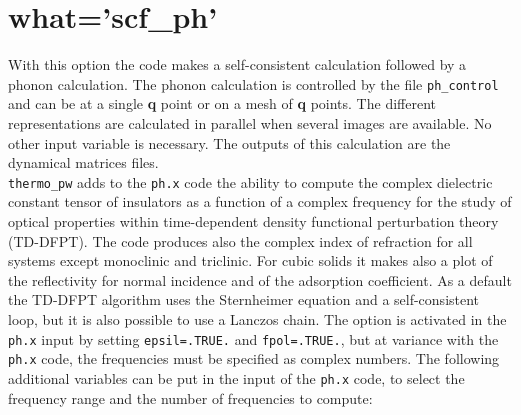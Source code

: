 \documentclass[12pt,a4paper,twoside]{report}
\begin{document}
\newpage
{\color{coral}\section{what='scf\_ph'}}
\color{black}
With this option the code makes a self-consistent calculation followed
by a phonon calculation. The phonon calculation is controlled by the file
\texttt{ph\_control} and can be at a single {\bf q} point or on a mesh of 
{\bf q} points. 
The different representations are calculated in parallel when several images 
are available. No other input variable is necessary. The outputs of this 
calculation are the dynamical matrices files. \\
\texttt{thermo\_pw} adds to the \texttt{ph.x} code the ability to
compute the complex dielectric constant tensor of insulators as a function 
of a complex frequency for the study of optical properties within 
time-dependent density functional perturbation theory (TD-DFPT). 
The code produces also the complex index of refraction for all
systems except monoclinic and triclinic. For cubic solids it makes
also a plot of the reflectivity for normal incidence and of the
adsorption coefficient.
As a default the TD-DFPT algorithm uses the Sternheimer equation and 
a self-consistent loop, but it is also possible to use a Lanczos chain.
The option is activated in the \texttt{ph.x} input by setting 
\texttt{epsil=.TRUE.} and \texttt{fpol=.TRUE.}, but at variance with
the \texttt{ph.x} code, the frequencies must be specified as complex numbers.
The following additional variables can be put in the input of the \texttt{ph.x}
code, to select the frequency range and the number of frequencies to compute:
\end{document}
